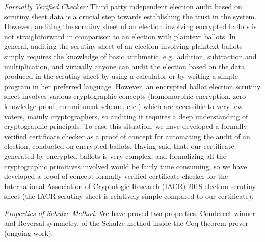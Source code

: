 \noindent 
\textit{Formally Verified Checker:} Third party independent election audit based on scrutiny sheet data is a crucial step towards 
establishing the trust in the system.   However, auditing the scrutiny sheet of an election involving encrypted ballots
is not straightforward in comparison to an election with plaintext ballots. 
In general, auditing the scrutiny sheet of an election involving 
plaintext ballots simply requires the knowledge of basic arithmetic, e.g.~addition, subtraction and multiplication, 
and virtually anyone can audit the election based on the data produced in the scrutiny sheet by
using a calculator or by writing a simple program in her preferred language. 
However, an encrypted ballot election scrutiny sheet involves various
cryptographic concepts (homomorphic encryption, zero-knowledge proof, commitment scheme, etc.) 
which are accessible to very few voters, mainly cryptographers,  so auditing it 
requires a deep understanding of cryptographic principals. To ease this situation, we have developed a formally verified 
certificate checker as a proof of concept for automating the audit of an election, conducted on encrypted ballots. 
Having said that,  our certificate generated by encrypted ballots is very complex, and formalizing all the cryptographic 
primitives involved would be fairly time consuming, so we have developed a proof of concept 
formally verified certificate checker for the International Association of Cryptologic Research (IACR) 2018 election
scrutiny sheet (the IACR scrutiny sheet is relatively simple compared to our certificate).

\noindent
\textit{Properties of Schulze Method:} We have proved two properties, Condercet winner and Reversal symmetry, 
of the Schulze method inside the Coq theorem prover (ongoing work).
 


